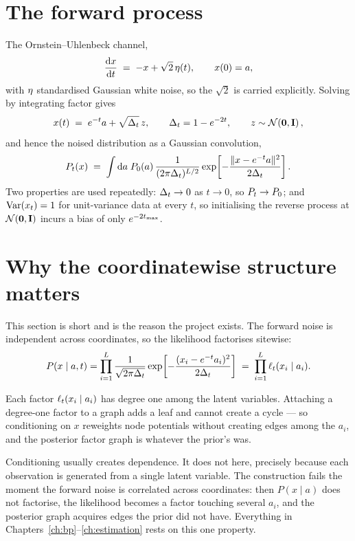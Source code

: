 \section{The forward process}

The Ornstein--Uhlenbeck channel,
\begin{equation}
\label{eq:ou}
\frac{\mathrm{d}x}{\mathrm{d}t} \;=\; -x + \sqrt{2}\,\mathbf{\eta}(t),
\qquad x(0) = a ,
\end{equation}
with $\mathbf{\eta}$ standardised Gaussian white noise, so the $\sqrt2$ is carried explicitly. Solving by
integrating factor gives
\begin{equation}
\label{eq:forward-solution}
x(t) \;=\; e^{-t} a + \sqrt{\Delta_t}\,z,
\qquad \Delta_t = 1 - e^{-2t},
\qquad z\sim\mathcal{N}\!\left(\mathbf{0},\mathbf{I}\right),
\end{equation}
and hence the noised distribution as a Gaussian convolution,
\begin{equation}
\label{eq:pt-def}
P_t(x) \;=\; \int \mathrm{d}a\; P_0(a)\,
\frac{1}{(2\pi\Delta_t)^{L/2}}
\exp\!\left[-\frac{\|x - e^{-t}a\|^2}{2\Delta_t}\right].
\end{equation}
Two properties are used repeatedly: $\Delta_t\to0$ as $t\to0$, so $P_t\to P_0$; and $\operatorname{Var}(x_t)=1$ for
unit-variance data at every $t$, so initialising the reverse process at $\mathcal{N}\!\left(\mathbf{0},\mathbf{I}\right)$
incurs a bias of only $e^{-2t_{\max}}$.

\section{Why the coordinatewise structure matters}
\label{sec:coordinatewise}

This section is short and is the reason the project exists. The forward noise is independent
across coordinates, so the likelihood factorises sitewise:
\begin{equation}
\label{eq:likelihood-factorises}
P(x \mid a, t)
= \prod_{i=1}^{L}
\frac{1}{\sqrt{2\pi\Delta_t}}
\exp\!\left[-\frac{(x_i - e^{-t}a_i)^2}{2\Delta_t}\right]
\;=\;\prod_{i=1}^{L} \ell_t(x_i \mid a_i).
\end{equation}

\begin{pitfall}
Each factor $\ell_t(x_i\mid a_i)$ has degree one among the latent variables. Attaching a
degree-one factor to a graph adds a leaf and cannot create a cycle --- so conditioning on $x$
reweights node potentials without creating edges among the $a_i$, and the posterior factor graph
is whatever the prior's was.

Conditioning usually creates dependence. It does not here, precisely because each observation is
generated from a single latent variable. The construction fails the moment the forward noise is
correlated across coordinates: then $P(x\mid a)$ does not factorise, the likelihood becomes a
factor touching several $a_i$, and the posterior graph acquires edges the prior did not have.
Everything in Chapters~\ref{ch:bp}--\ref{ch:estimation} rests on this one property.
\end{pitfall}

